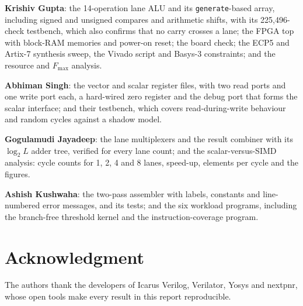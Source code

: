 \documentclass[journal]{IEEEtran}
\begin{document}
\textbf{Krishiv Gupta}: the 14-operation lane ALU and its \texttt{generate}-based array,
including signed and unsigned compares and arithmetic shifts, with its 225,496-check testbench, which also confirms that no carry crosses a lane; the FPGA top with
block-RAM memories and power-on reset; the board check; the ECP5 and Artix-7 synthesis
sweep, the Vivado script and Basys-3 constraints; and the resource and $F_{\max}$
analysis.

\textbf{Abhiman Singh}: the vector and scalar register files, with two read ports and
one write port each, a hard-wired zero register and the debug port that forms the scalar
interface; and their testbench, which covers read-during-write behaviour and random
cycles against a shadow model.

\textbf{Gogulamudi Jayadeep}: the lane multiplexers and the result combiner with its $\log_2 L$
adder tree, verified for every lane count; and the scalar-versus-SIMD analysis: cycle
counts for 1, 2, 4 and 8 lanes, speed-up, elements per cycle and the figures.

\textbf{Ashish Kushwaha}: the two-pass assembler with labels, constants and
line-numbered error messages, and its tests; and the six workload programs, including
the branch-free threshold kernel and the instruction-coverage program.

\section*{Acknowledgment}
The authors thank the developers of Icarus Verilog, Verilator, Yosys and nextpnr, whose
open tools make every result in this report reproducible.
\end{document}
